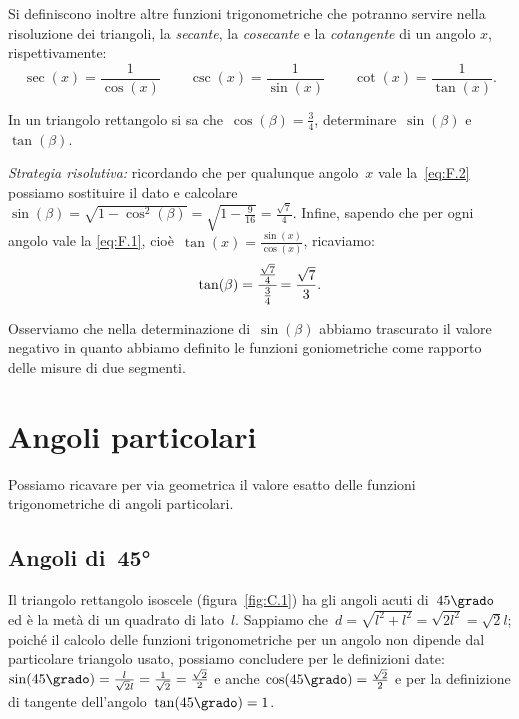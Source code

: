 \begin{definizione}
Si definiscono inoltre altre funzioni trigonometriche che potranno servire nella risoluzione dei triangoli, la
\emph{secante}, la \emph{cosecante} e la \emph{cotangente} di un angolo $x$, rispettivamente:
\[\sec(x)=\frac{1}{\cos(x)}\qquad\csc(x)=\frac{1}{\sin(x)}\qquad\cot(x)=\frac{1}{\tan(x)}.\]
\end{definizione}

\begin{exrig}
 \begin{esempio}
In un triangolo rettangolo si sa che~$\cos(\beta)=\frac{3}{4}$, determinare~$\sin(\beta)$ e~$\tan(\beta)$.

\emph{Strategia risolutiva:}
ricordando che per qualunque angolo~$x$ vale la~\ref{eq:F.2} possiamo sostituire il dato e calcolare
$\sin(\beta)=\sqrt{1-\cos ^{2}(\beta )}=\sqrt{1-\frac{9}{16}}=\frac{\sqrt{7}}{4}$. Infine, sapendo che per ogni
angolo vale la \ref{eq:F.1}, cioè~$\tan(x)=\frac{\sin(x)}{\cos (x)}$, ricaviamo:
\[\tan(\beta)=\cfrac{\frac{\sqrt{7}}{4}}{\frac{3}{4}}=\frac{\sqrt{7}}{3}.\]

Osserviamo che nella determinazione di~$\sin(\beta)$ abbiamo trascurato il valore negativo in quanto abbiamo definito
le funzioni goniometriche come rapporto delle misure di due segmenti.
 \end{esempio}
\end{exrig}

\ovalbox{\risolvi \ref{ese:C.2}}

\section{Angoli particolari}
Possiamo ricavare per via geometrica il valore esatto delle funzioni trigonometriche di angoli particolari.

\subsection{Angoli di~45°}

 Il triangolo rettangolo isoscele (figura~\ref{fig:C.1}) ha gli angoli acuti di~$45\grado$ ed è la metà di un quadrato di lato~$l$.
Sappiamo che~$d=\sqrt{l^{2}+l^{2}}=\sqrt{2l^2}=\sqrt{2}l$; poiché il calcolo delle funzioni trigonometriche per un angolo
non dipende dal particolare triangolo usato, possiamo concludere per le definizioni date:
$\sin(45\grado)=\frac{l}{\sqrt{2}l}=\frac{1}{\sqrt{2}}=\frac{\sqrt{2}}{2}$ e anche
$\cos(45\grado)=\frac{\sqrt{2}}{2}$ e per la definizione di tangente dell'angolo~$\tan(45\grado)=1$.

